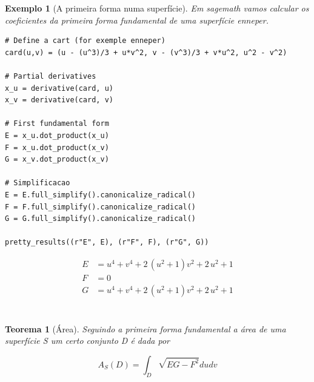 \documentclass[12pt]{article}
\newtheorem{ex}{Exemplo}[section]
\newtheorem{theorem}{Teorema}
\begin{document}
\begin{ex}[A primeira forma numa  superfície]
Em \textit{sagemath} vamos calcular os coeficientes da primeira forma fundamental de uma superfície enneper.

\begin{lstlisting}
# Define a cart (for exemple enneper)
card(u,v) = (u - (u^3)/3 + u*v^2, v - (v^3)/3 + v*u^2, u^2 - v^2)

# Partial derivatives
x_u = derivative(card, u)
x_v = derivative(card, v)

# First fundamental form
E = x_u.dot_product(x_u)
F = x_u.dot_product(x_v)
G = x_v.dot_product(x_v)

# Simplificacao
E = E.full_simplify().canonicalize_radical()
F = F.full_simplify().canonicalize_radical()
G = G.full_simplify().canonicalize_radical()

pretty_results((r"E", E), (r"F", F), (r"G", G))
\end{lstlisting}

\begin{align*} E &= u^{4} + v^{4} + 2 \, {\left(u^{2} + 1\right)} v^{2} + 2 \, u^{2} + 1 \\ F &= 0 \\ G &= u^{4} + v^{4} + 2 \, {\left(u^{2} + 1\right)} v^{2} + 2 \, u^{2} + 1 \\ \end{align*} \\
\end{ex}

\begin{theorem}[Área]
Seguindo a primeira forma fundamental a área de uma superfície S um certo conjunto D é dada por

\begin{equation*}
    A_S(D) = \int_D \sqrt{E G - F^2} d u d v
\end{equation*}
\end{theorem}
\end{document}

